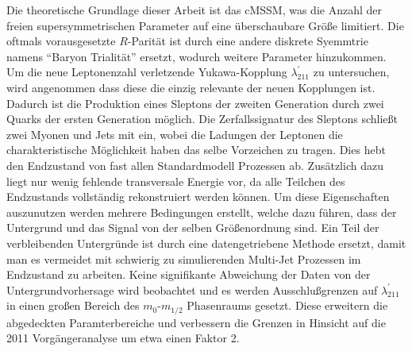 \documentclass[11pt,a4paper,twoside,openright,DIV=13,BCOR=1cm]{scrbook} %
\numberwithin{equation}{chapter} %
\numberwithin{figure}{chapter} %
\numberwithin{table}{chapter} %
\begin{document}
Die theoretische Grundlage dieser Arbeit ist das cMSSM, was die Anzahl der freien supersymmetrischen Parameter auf eine überschaubare Größe limitiert. Die oftmals vorausgesetzte $R$-Parität ist durch eine andere diskrete Syemmtrie namens ``Baryon Trialität'' ersetzt, wodurch weitere Parameter hinzukommen. Um die neue Leptonenzahl verletzende Yukawa-Kopplung $\lambda^\prime_{211}$ zu untersuchen, wird angenommen dass diese die einzig relevante der neuen Kopplungen ist. Dadurch ist die Produktion eines Sleptons der zweiten Generation durch zwei Quarks der ersten Generation möglich. Die Zerfallssignatur des Sleptons schließt zwei Myonen und Jets mit ein, wobei die Ladungen der Leptonen die charakteristische Möglichkeit haben das selbe Vorzeichen zu tragen. Dies hebt den Endzustand von fast allen Standardmodell Prozessen ab. Zusätzlich dazu liegt nur wenig fehlende transversale Energie vor, da alle Teilchen des Endzustands vollständig rekonstruiert werden können. Um diese Eigenschaften auszunutzen werden mehrere Bedingungen erstellt, welche dazu führen, dass der Untergrund und das Signal von der selben Größenordnung sind. Ein Teil der verbleibenden Untergründe ist durch eine datengetriebene Methode ersetzt, damit man es vermeidet mit schwierig zu simulierenden Multi-Jet Prozessen im Endzustand zu arbeiten. Keine signifikante Abweichung der Daten von der Untergrundvorhersage wird beobachtet und es werden Ausschlußgrenzen auf $\lambda^\prime_{211}$ in einen großen Bereich des $m_0$-$m_{1/2}$ Phasenraums gesetzt. Diese erweitern die abgedeckten Paramterbereiche und verbessern die Grenzen in Hinsicht auf die 2011 Vorgängeranalyse um etwa einen Faktor 2.


\newpage
\tableofcontents














\appendix

% 



\printbibliography[heading=bibintoc]
\end{document}
